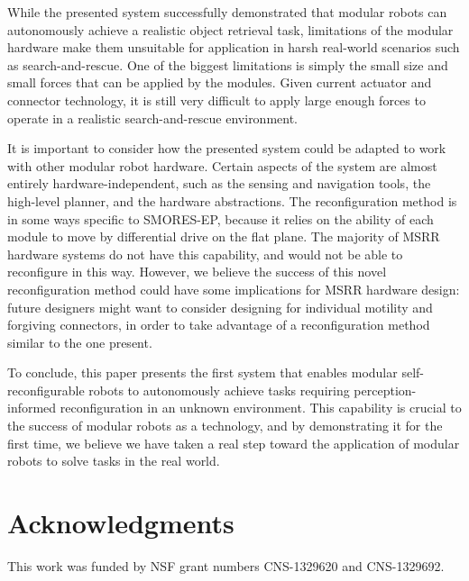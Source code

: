 \documentclass[conference]{IEEEtran}
\begin{document}
While the presented system successfully demonstrated that modular robots can autonomously achieve a realistic object retrieval task, limitations of the modular hardware make them unsuitable for application in harsh real-world scenarios such as search-and-rescue.  One of the biggest limitations is simply the small size and small forces that can be applied by the modules.  Given current actuator and connector technology, it is still very difficult to apply large enough forces to operate in a realistic search-and-rescue environment. 

It is important to consider how the presented system could be adapted to work with other modular robot hardware.  Certain aspects of the system are almost entirely hardware-independent, such as the sensing and navigation tools, the high-level planner, and the hardware abstractions.  The reconfiguration method is in some ways specific to SMORES-EP, because it relies on the ability of each module to move by differential drive on the flat plane.  The majority of MSRR hardware systems do not have this capability, and would not be able to reconfigure in this way.  However, we believe the success of this novel reconfiguration method could have some implications for MSRR hardware design: future designers might want to consider designing for individual motility and forgiving connectors, in order to take advantage of a reconfiguration method similar to the one present.

To conclude, this paper presents the first system that enables modular self-reconfigurable robots to autonomously achieve tasks requiring perception-informed reconfiguration in an unknown environment.  This capability is crucial to the success of modular robots as a technology, and by demonstrating it for the first time, we believe we have taken a real step toward the application of modular robots to solve tasks in the real world.
%
\section*{Acknowledgments}
%
This work was funded by NSF grant numbers CNS-1329620 and CNS-1329692.





\end{document}
